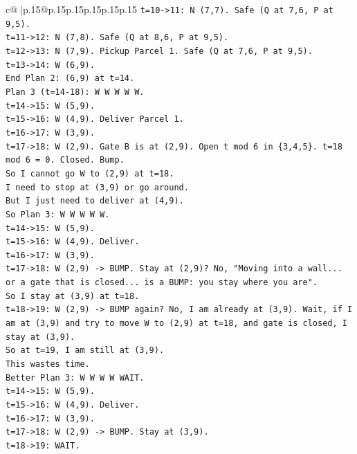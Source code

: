 \documentclass{article}
\begin{document}
{\begin{supertabular}{c@{$\;$}|p{.15\linewidth}@{}p{.15\linewidth}p{.15\linewidth}p{.15\linewidth}p{.15\linewidth}p{.15\linewidth}}
{{{\texttt{t=10{-}>11: N (7,7). Safe (Q at 7,6, P at 9,5).} \\
\texttt{t=11{-}>12: N (7,8). Safe (Q at 8,6, P at 9,5).} \\
\texttt{t=12{-}>13: N (7,9). Pickup Parcel 1. Safe (Q at 7,6, P at 9,5).} \\
\texttt{t=13{-}>14: W (6,9).} \\
\texttt{End Plan 2: (6,9) at t=14.} \\
\texttt{Plan 3 (t=14{-}18): W W W W W.} \\
\texttt{t=14{-}>15: W (5,9).} \\
\texttt{t=15{-}>16: W (4,9). Deliver Parcel 1.} \\
\texttt{t=16{-}>17: W (3,9).} \\
\texttt{t=17{-}>18: W (2,9). Gate B is at (2,9). Open t mod 6 in \{3,4,5\}. t=18 mod 6 = 0. Closed. Bump.} \\
\texttt{So I cannot go W to (2,9) at t=18.} \\
\texttt{I need to stop at (3,9) or go around.} \\
\texttt{But I just need to deliver at (4,9).} \\
\texttt{So Plan 3: W W W W W.} \\
\texttt{t=14{-}>15: W (5,9).} \\
\texttt{t=15{-}>16: W (4,9). Deliver.} \\
\texttt{t=16{-}>17: W (3,9).} \\
\texttt{t=17{-}>18: W (2,9) {-}> BUMP. Stay at (2,9)? No, "Moving into a wall... or a gate that is closed... is a BUMP: you stay where you are".} \\
\texttt{So I stay at (3,9) at t=18.} \\
\texttt{t=18{-}>19: W (2,9) {-}> BUMP again? No, I am already at (3,9). Wait, if I am at (3,9) and try to move W to (2,9) at t=18, and gate is closed, I stay at (3,9).} \\
\texttt{So at t=19, I am still at (3,9).} \\
\texttt{This wastes time.} \\
\texttt{Better Plan 3: W W W W WAIT.} \\
\texttt{t=14{-}>15: W (5,9).} \\
\texttt{t=15{-}>16: W (4,9). Deliver.} \\
\texttt{t=16{-}>17: W (3,9).} \\
\texttt{t=17{-}>18: W (2,9) {-}> BUMP. Stay at (3,9).} \\
\texttt{t=18{-}>19: WAIT.} \\
}}}
\end{supertabular}}
\end{document}
